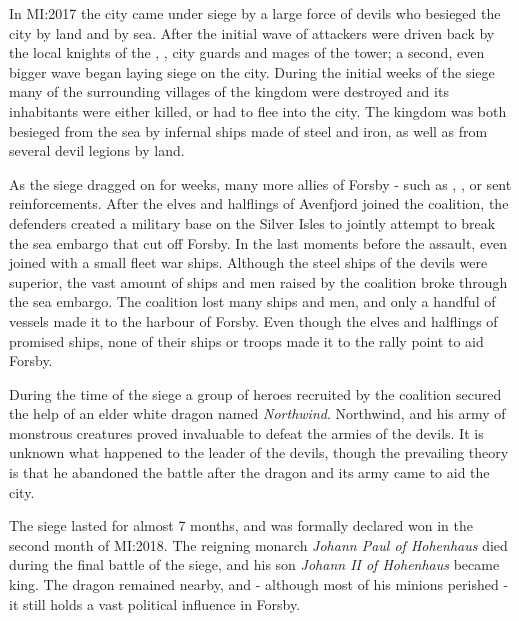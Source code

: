 
In MI:2017 the city came under siege by a large force of devils who besieged
the city by land and by sea. After the initial wave of attackers were driven
back by the local knights of the , , city
guards and mages of the tower; a second, even bigger wave began laying siege
on the city. During the initial weeks of the siege many of the surrounding
villages of the kingdom were destroyed and its inhabitants were either killed,
or had to flee into the city. The kingdom was both besieged from the sea by
infernal ships made of steel and iron, as well as from several devil legions
by land.

As the siege dragged on for weeks, many more allies of Forsby - such as
, ,  or
 sent reinforcements. After the elves and halflings of
Avenfjord joined the coalition, the defenders created a military base on the
Silver Isles to jointly attempt to break the sea embargo that cut off
Forsby. In the last moments before the assault, even  joined
with a small fleet war ships. Although the steel ships of the devils were
superior, the vast amount of ships and men raised by the coalition broke
through the sea embargo. The coalition lost many ships and men, and only a
handful of vessels made it to the harbour of Forsby. Even though the elves and
halflings of  promised ships, none of their ships or
troops made it to the rally point to aid Forsby.

During the time of the siege a group of heroes recruited by the coalition
secured the help of an elder white dragon named \emph{Northwind}. Northwind,
and his army of monstrous creatures proved invaluable to defeat the armies of
the devils. It is unknown what happened to the leader of the devils, though
the prevailing theory is that he abandoned the battle after the dragon and its
army came to aid the city.

The siege lasted for almost 7 months, and was formally declared won in the
second month of MI:2018. The reigning monarch \emph{Johann Paul of Hohenhaus}
died during the final battle of the siege, and his son \emph{Johann II of
  Hohenhaus} became king. The dragon remained nearby, and - although most of
his minions perished - it still holds a vast political influence in Forsby.

